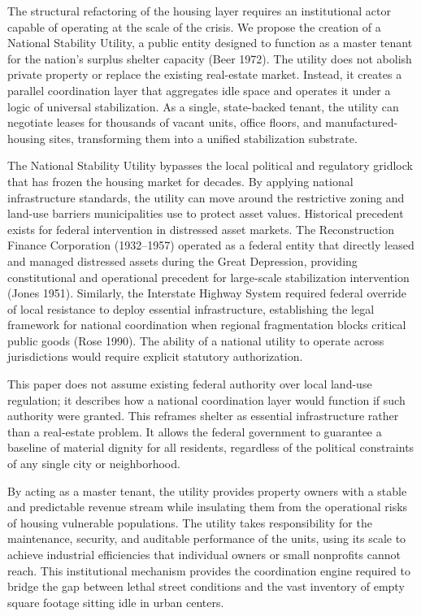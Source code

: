 \documentclass[
  12pt,
]{article}
\begin{document}
The structural refactoring of the housing layer requires an institutional actor capable of operating at the scale of the crisis. We propose the creation of a National Stability Utility, a public entity designed to function as a master tenant for the nation's surplus shelter capacity (Beer 1972). The utility does not abolish private property or replace the existing real-estate market. Instead, it creates a parallel coordination layer that aggregates idle space and operates it under a logic of universal stabilization. As a single, state-backed tenant, the utility can negotiate leases for thousands of vacant units, office floors, and manufactured-housing sites, transforming them into a unified stabilization substrate.

The National Stability Utility bypasses the local political and regulatory gridlock that has frozen the housing market for decades. By applying national infrastructure standards, the utility can move around the restrictive zoning and land-use barriers municipalities use to protect asset values. Historical precedent exists for federal intervention in distressed asset markets. The Reconstruction Finance Corporation (1932--1957) operated as a federal entity that directly leased and managed distressed assets during the Great Depression, providing constitutional and operational precedent for large-scale stabilization intervention (Jones 1951). Similarly, the Interstate Highway System required federal override of local resistance to deploy essential infrastructure, establishing the legal framework for national coordination when regional fragmentation blocks critical public goods (Rose 1990). The ability of a national utility to operate across jurisdictions would require explicit statutory authorization.

This paper does not assume existing federal authority over local land-use regulation; it describes how a national coordination layer would function if such authority were granted. This reframes shelter as essential infrastructure rather than a real-estate problem. It allows the federal government to guarantee a baseline of material dignity for all residents, regardless of the political constraints of any single city or neighborhood.

By acting as a master tenant, the utility provides property owners with a stable and predictable revenue stream while insulating them from the operational risks of housing vulnerable populations. The utility takes responsibility for the maintenance, security, and auditable performance of the units, using its scale to achieve industrial efficiencies that individual owners or small nonprofits cannot reach. This institutional mechanism provides the coordination engine required to bridge the gap between lethal street conditions and the vast inventory of empty square footage sitting idle in urban centers.
\end{document}
